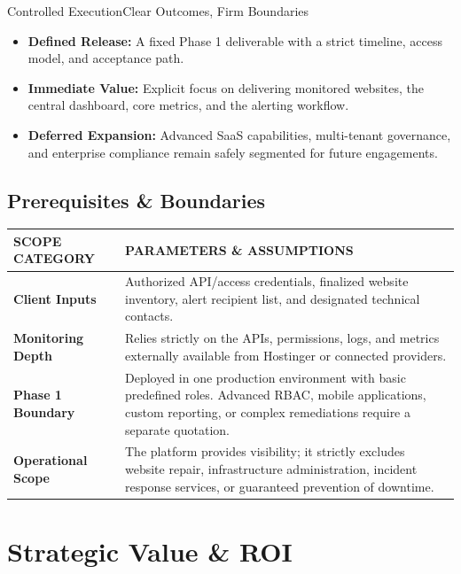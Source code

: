 \documentclass[11pt,a4paper]{article}
\newcommand{\thd}[1]{\textsc{\bfseries\color{white}\fontsize{8.6}{8.6}\selectfont #1}}
\begin{document}
\begin{recbox}{Controlled Execution}{Clear Outcomes, Firm Boundaries}
\begin{itemize}
  \item \textbf{Defined Release:} A fixed Phase 1 deliverable with a strict timeline, access model, and acceptance path.
  \item \textbf{Immediate Value:} Explicit focus on delivering monitored websites, the central dashboard, core metrics, and the alerting workflow.
  \item \textbf{Deferred Expansion:} Advanced SaaS capabilities, multi-tenant governance, and enterprise compliance remain safely segmented for future engagements.
\end{itemize}
\end{recbox}

\vspace{1em}
\subsection{Prerequisites \& Boundaries}
\vspace{0.5em}
\renewcommand{\arraystretch}{1.7}
\begin{tabular}{@{}>{\raggedright\arraybackslash}p{0.25\linewidth}p{0.75\linewidth}@{}}
\rowcolor{navy}
\thd{SCOPE CATEGORY} & \thd{PARAMETERS \& ASSUMPTIONS} \\
\midrule
\textbf{Client Inputs} & Authorized API/access credentials, finalized website inventory, alert recipient list, and designated technical contacts. \\
\rowcolor{tabletint}
\textbf{Monitoring Depth} & Relies strictly on the APIs, permissions, logs, and metrics externally available from Hostinger or connected providers. \\
\textbf{Phase 1 Boundary} & Deployed in one production environment with basic predefined roles. Advanced RBAC, mobile applications, custom reporting, or complex remediations require a separate quotation. \\
\rowcolor{tabletint}
\textbf{Operational Scope} & The platform provides visibility; it strictly excludes website repair, infrastructure administration, incident response services, or guaranteed prevention of downtime. \\
\bottomrule
\end{tabular}

\clearpage
\section{Strategic Value \& ROI}
\end{document}
